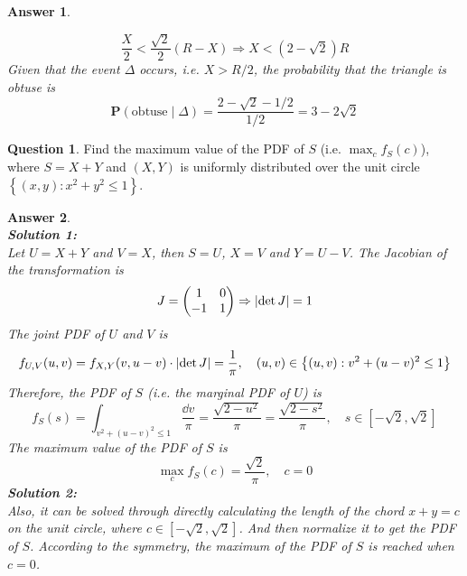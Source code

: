 \documentclass[utf8]{article}
\theoremstyle{definition}%
\newtheorem{question}{Question} %
\theoremstyle{plain}%
\newtheorem{answer}{Answer} %
\begin{document}
\begin{answer}
\begin{enumerate}[label=(\alph*)]
        \begin{equation}
            \frac{X}{2} < \frac{\sqrt{2}}{2}(R - X) \Rightarrow X < \left(2 - \sqrt{2}\right)R
        \end{equation}
        Given that the event $\Delta$ occurs, i.e. $X > R/2$, the probability that the triangle is obtuse is
        \begin{equation}
            \mathbf{P}(\text{obtuse} \mid \Delta) = \frac{2 - \sqrt{2} - 1/2}{1/2} = 3 - 2\sqrt{2}
        \end{equation}
    \end{enumerate}
\end{answer}

\begin{question}
    Find the maximum value of the PDF of $S$ (i.e. $\max_c f_{S}(c)$), where $S = X + Y$ and $(X, Y)$ is uniformly distributed over the unit circle $\left\{(x, y) : x^2 + y^2 \leq 1\right\}$.
\end{question}
\begin{answer} ~ \\ 
    \textbf{Solution 1:} \\ 
    Let $U = X + Y$ and $V = X$, then $S = U$, $X = V$ and $Y = U - V$. The Jacobian of the transformation is
    \begin{equation}
        J = \mqty(1 & 0 \\ -1 & 1) \Rightarrow \abs{\det J} = 1
    \end{equation}
    The joint PDF of $U$ and $V$ is
    \begin{equation}
        f_{U, V}(u, v) = f_{X, Y}(v, u-v) \cdot \abs{\det J} = \frac{1}{\pi}, \quad (u, v) \in \left\{(u, v) : v^2 + (u-v)^2 \leq 1\right\}
    \end{equation}
    Therefore, the PDF of $S$ (i.e. the marginal PDF of $U$) is
    \begin{equation}
        f_{S}(s) = \int_{v^2+(u-v)^2 \leq 1} \frac{\dd{v}}{\pi} = \frac{\sqrt{2 - u^2}}{\pi} = \frac{\sqrt{2 - s^2}}{\pi}, \quad s \in [-\sqrt{2}, \sqrt{2}]
    \end{equation}
    The maximum value of the PDF of $S$ is
    \begin{equation}
        \max_c f_{S}(c) = \frac{\sqrt{2}}{\pi}, \quad c = 0
    \end{equation}
    \textbf{Solution 2:} \\
    Also, it can be solved through directly calculating the length of the chord $x + y = c$ on the unit circle, where $c \in [-\sqrt{2}, \sqrt{2}]$. And then normalize it to get the PDF of $S$. According to the symmetry, the maximum of the PDF of $S$ is reached when $c = 0$.
\end{answer}
\end{document}
